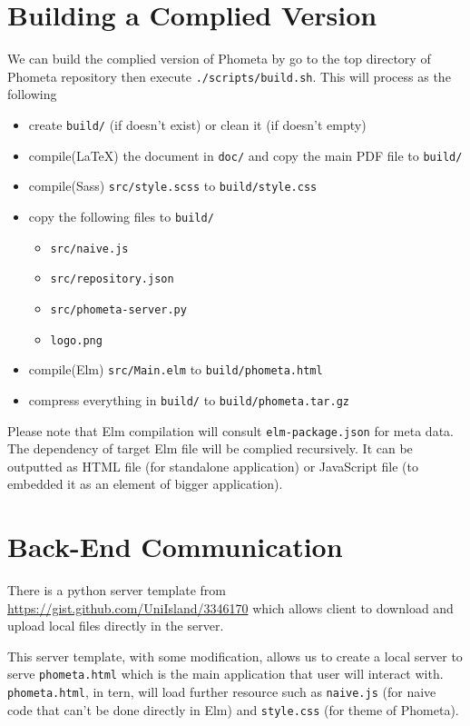 \documentclass[master.tex]{subfiles}
\begin{document}
\section{Building a Complied Version}
We can build the complied version of Phometa by go to the top directory of
Phometa repository then execute \texttt{./scripts/build.sh}. This will process
as the following
\begin{itemize}
\item create \texttt{build/} (if doesn't exist) or clean it (if doesn't empty)
\item compile(\LaTeX) the document in \texttt{doc/} and copy the main PDF file to \texttt{build/}
\item compile(Sass) \texttt{src/style.scss} to \texttt{build/style.css}
\item copy the following files to \texttt{build/}
  \begin{itemize}
  \item \texttt{src/naive.js}
  \item \texttt{src/repository.json}
  \item \texttt{src/phometa-server.py}
  \item \texttt{logo.png}
  \end{itemize}
\item compile(Elm) \texttt{src/Main.elm} to \texttt{build/phometa.html}
\item compress everything in \texttt{build/} to \texttt{build/phometa.tar.gz}
\end{itemize}

Please note that Elm compilation will consult \texttt{elm-package.json} for meta
data. The dependency of target Elm file will be complied recursively. It can be
outputted as HTML file (for standalone application) or JavaScript file (to
embedded it as an element of bigger application).

\section{Back-End Communication}
There is a python server template from
\url{https://gist.github.com/UniIsland/3346170} which allows client to
download and upload local files directly in the server.

This server template, with some modification, allows us to create a local server
to serve \texttt{phometa.html} which is the main application that user will
interact with. \texttt{phometa.html}, in tern, will load further resource such
as \texttt{naive.js} (for naive code that can't be done directly in Elm) and
\texttt{style.css} (for theme of Phometa).
\end{document}
